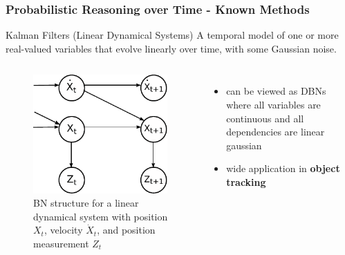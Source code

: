 \begin{frame}[t]
    \frametitle{Probabilistic Reasoning over Time - Known Methods}
  
  \begin{block}{Kalman Filters (Linear Dynamical Systems)}
  	A temporal model of one or more real-valued variables that \alert{evolve linearly} over time, with some 
  	\alert{Gaussian noise}.
  \end{block}
  
  \begin{columns}[T]
  	\begin{figure}
  		\centering
  		\includegraphics[height=0.35\textheight]{graphics/hmm-intro/kalman/kalman_filter_simple.pdf}
  		\caption{\tiny{BN structure for a linear dynamical system with position $X_t$, 
  		velocity $\dot{X}_t$, and position measurement $Z_t$}}
  	\end{figure}
	  
  	\begin{itemize}
  	\item \footnotesize{can be viewed as DBNs where all variables are continuous and all dependencies are 
  		linear gaussian}
  	\item \footnotesize{wide application in \textbf{object tracking}}
  \end{itemize}
  \end{columns}
  
\end{frame}

